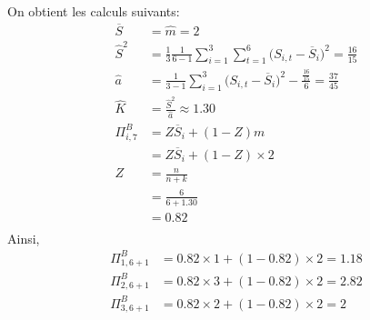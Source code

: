 \bigskip
On obtient les calculs suivants:
\begin{align*}
\overline{S} &= \widehat{m} = 2 \\
\widehat{S}^2 &= \frac{1}{3} \frac{1}{6-1} \sum_{i=1}^{3} \sum_{t=1}^{6} \Big(S_{i,t} - \overline{S}_i \Big)^2 = \frac{16}{15} \\
\widehat{a} &= \frac{1}{3-1} \sum_{i=1}^{3} \Big(S_{i,t} - \overline{S}_i \Big)^2 - \frac{\frac{16}{15}}{6}= \frac{37}{45} \\
\widehat{K} &= \frac{\widehat{S}^2}{\widehat{a}} \approx 1.30 \\
\Pi_{i,7}^{B} &= Z \overline{S}_i + (1 - Z) m \\
&= Z \overline{S}_i + (1 - Z) \times 2 \\
Z &= \frac{n}{n +k} \\
&= \frac{6}{6 + 1.30} \\
&= 0.82\\
\end{align*}
Ainsi,
\begin{align*}
\Pi_{1,6+1}^{B} &= 0.82 \times 1 + (1 - 0.82) \times 2 = 1.18 \\
\Pi_{2,6+1}^{B} &= 0.82 \times 3 + (1 - 0.82) \times 2 = 2.82 \\
\Pi_{3,6+1}^{B} &= 0.82 \times 2 + (1 - 0.82) \times 2 = 2 \\
\end{align*}
